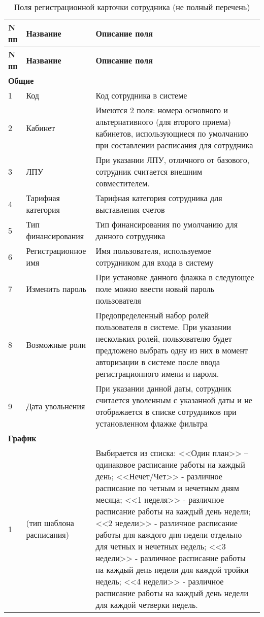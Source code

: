 {\small
\begin{longtable}{|p{0.55cm}|p{4cm}|p{12cm}|}
\caption{Поля регистрационной карточки сотрудника (не полный перечень) \label{tbl_spr_perscard}} \\
\hline \rule{0pt}{15pt} \centering \textbf{N пп} & \centering \textbf{Название} & \hfil \textbf{Описание поля} \\ \hline
\endfirsthead
\hline \rule{0pt}{15pt} \centering \textbf{N пп} & \centering \textbf{Название} & \hfil \textbf{Описание поля} \\ \hline
\endhead
\multicolumn{3}{|l|}{\textbf{Общие}} \\ \hline
1	&  Код	& Код сотрудника в системе \\ \hline
2	& Кабинет	& Имеются 2 поля: номера основного и альтернативного (для второго приема) кабинетов, использующиеся по умолчанию при составлении расписания для сотрудника \\ \hline
3	& ЛПУ	& При указании ЛПУ, отличного от базового, сотрудник считается внешним совместителем. \\ \hline
4	& Тарифная категория	& Тарифная категория сотрудника для выставления счетов \\ \hline
5	& Тип финансирования	& Тип финансирования по умолчанию для данного сотрудника \\ \hline
6	& Регистрационное имя	& Имя пользователя, используемое сотрудником для входа в систему \\ \hline
7 &	Изменить пароль &	При установке данного флажка в следующее поле можно ввести новый пароль пользователя \\ \hline
8	& Возможные роли	& Предопределенный набор ролей пользователя в системе. При указании нескольких ролей, пользователю будет предложено выбрать одну из них в момент авторизации в системе после ввода регистрационного имени и пароля. \\ \hline
9	& Дата увольнения	& При указании данной даты, сотрудник считается уволенным с указанной даты и не отображается в списке сотрудников при установленном флажке фильтра \dm{Только работающие} \\ \hline
\multicolumn{3}{|l|}{\textbf{График}} \\ \hline
1	& (тип шаблона расписания)	& Выбирается из списка: <<Один план>> – одинаковое расписание работы на каждый день; <<Нечет\slash Чет>> - различное расписание по четным и нечетным дням месяца; <<1 неделя>> - различное расписание работы на каждый день недели; <<2 недели>> - различное расписание работы для каждого дня недели отдельно для четных и нечетных недель; <<3 недели>> - различное расписание работы на каждый день недели для каждой тройки недель; <<4 недели>> - различное расписание работы на каждый день недели для каждой четверки недель.  \\ \hline

\end{longtable}}
